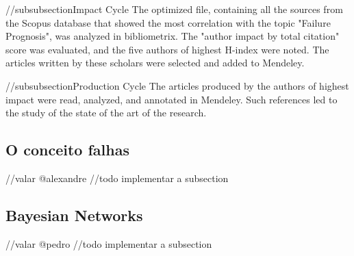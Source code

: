 //subsubsection{Impact Cycle}
The optimized file, containing all the sources from the Scopus database that showed the most correlation with the topic "Failure Prognosis", was analyzed in bibliometrix. 
The "author impact by total citation" score was evaluated, and the five authors of highest H-index were noted. The articles written by these scholars were selected and added to Mendeley.

//subsubsection{Production Cycle}
The articles produced by the authors of highest impact were read, analyzed, and annotated in Mendeley.
Such references led to the study of the state of the art of the research.

\subsection{O conceito falhas}
//valar @alexandre
//todo implementar a subsection


\subsection{Bayesian Networks}
//valar @pedro
//todo implementar a subsection
